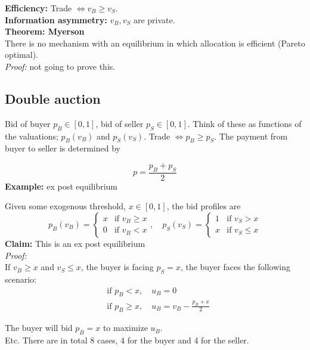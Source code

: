 \documentclass{article}
\begin{document}
\noindent
\textbf{Efficiency:} Trade $\iff v_B\geq v_S$.\\
\noindent
\textbf{Information asymmetry:} $v_B, v_S$ are private.\\

\noindent
\textbf{Theorem: Myerson}\\
There is no mechanism with an equilibrium in which allocation is efficient (Pareto optimal).\\
\textit{Proof:} not going to prove this.

\subsection*{Double auction}
Bid of buyer $p_B \in[0,1]$, bid of seller $p_S\in[0,1]$. Think of these as functions of the valuations; $p_B(v_B)$ and $p_S(v_S)$. Trade $\iff p_B\geq p_S$. The payment from buyer to seller is determined by

\begin{equation*}
    p=\frac{p_B+p_S}{2}
\end{equation*}
\textbf{Example:} ex post equilibrium\\
\noindent

Given some exogenous threshold, $x\in[0,1]$, the bid profiles are
\begin{equation*}
        p_B(v_B)=
        \begin{cases}
            x&\text{if }v_B\geq x\\
            0&\text{if }v_B<x
        \end{cases}
        ,\quad p_S(v_S)=
        \begin{cases}
            1&\text{if }v_S>x\\
            x&\text{if }v_S\leq x
        \end{cases}
\end{equation*}
\textbf{Claim:} This is an ex post equilibrium\\
\noindent
\textit{Proof:}\\
If $v_B\geq x$ and $v_S \leq x$, the buyer is facing $p_S=x$, the buyer faces the following scenario:
\begin{equation*}
\begin{aligned}
    &\text{if }p_B<x,\quad u_B=0\\
    &\text{if }p_B\geq x,\quad u_B=v_B-\frac{p_B+x}{2}
\end{aligned}
\end{equation*}

The buyer will bid $p_B=x$ to maximize $u_B$.\\
Etc. There are in total 8 cases, 4 for the buyer and 4 for the seller.\\
\end{document}
